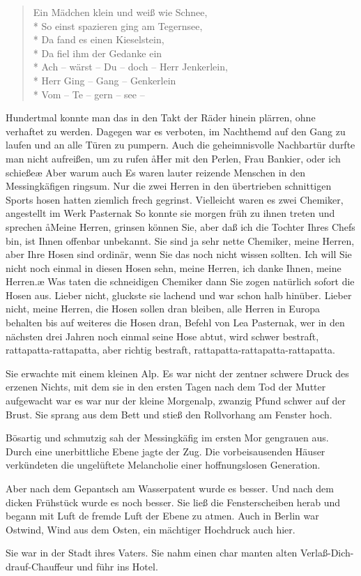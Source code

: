 \begin{verse}Ein Mädchen klein und weiß wie Schnee,\\*
So einst spazieren ging am Tegernsee,\\*
Da fand es einen Kieselstein,\\*
Da fiel ihm der Gedanke ein\dopp\\*
Ach -- wärst -- Du -- doch -- Herr Jenkerlein,\\*
Herr Ging -- Gang -- Genkerlein\\*
Vom -- Te -- gern -- see --
\end{verse}

Hundertmal konnte man das in den Takt der Räder hinein\-%
plärren, ohne verhaftet zu werden. Dagegen war es verboten,
im Nachthemd auf den Gang zu laufen und an alle Türen
zu pumpern. Auch die geheimnisvolle Nachbartür durfte
man nicht aufreißen, um zu rufen\dopp{} \aa Her mit den Perlen, Frau
Bankier, oder ich schieße\ausr\ae{} Aber warum auch\frag{} Es waren
lauter reizende Menschen in den Messingkäfigen ringsum.
Nur die zwei Herren in den übertrieben schnittigen Sports\-%
hosen hatten ziemlich frech gegrinst. Vielleicht waren es zwei
Chemiker, angestellt im Werk Pasternak\frag{} So konnte sie morgen
früh zu ihnen treten und sprechen\dopp{} \aa Meine Herren, grinsen
können Sie, aber daß ich die Tochter Ihres Chefs bin, ist
Ihnen offenbar unbekannt. Sie sind ja sehr nette Chemiker,
meine Herren, aber Ihre Hosen sind ordinär, wenn Sie das
noch nicht wissen sollten. Ich will Sie nicht noch einmal in
diesen Hosen sehn, meine Herren, ich danke Ihnen, meine
Herren.\ae{} Was taten die schneidigen Chemiker dann\frag{} Sie
zogen natürlich sofort die Hosen aus. Lieber nicht, gluckste
sie lachend und war schon halb hinüber. Lieber nicht, meine
Herren, die Hosen sollen dran bleiben, alle Herren in Europa
behalten bis auf weiteres die Hosen dran, Befehl von Lea
Pasternak, wer in den nächsten drei Jahren noch einmal seine
Hose abtut, wird schwer bestraft, rattapatta-rattapatta, aber
richtig bestraft, rattapatta-rattapatta-rattapatta.

Sie erwachte mit einem kleinen Alp. Es war nicht der zentner\-%
schwere Druck des erzenen Nichts, mit dem sie in den ersten
Tagen nach dem Tod der Mutter aufgewacht war\semi{} es war
nur der kleine Morgenalp, zwanzig Pfund schwer auf der
Brust. Sie sprang aus dem Bett und stieß den Rollvorhang
am Fenster hoch.

Bösartig und schmutzig sah der Messingkäfig im ersten Mor\-%
gengrauen aus. Durch eine unerbittliche Ebene jagte der Zug.
Die vorbeisausenden Häuser verkündeten die ungelüftete
Melancholie einer hoffnungslosen Generation.

Aber nach dem Gepantsch am Wasserpatent wurde es besser.
Und nach dem dicken Frühstück wurde es noch besser. Sie ließ
die Fensterscheiben herab und begann mit Luft de fremde
Luft der Ebene zu atmen. Auch in Berlin war Ostwind, Wind
aus dem Osten, ein mächtiger Hochdruck auch hier.

Sie war in der Stadt ihres Vaters. Sie nahm einen char\-%
manten alten Verlaß-Dich-drauf-Chauffeur und führ ins
Hotel.